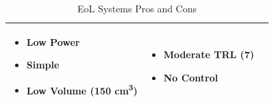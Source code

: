 \begin{table}[H]
\begin{tabular}{|p{}|p{}|p{}|}
    \begin{itemize}
        \item Low Power
        \item Simple
        \item Low Volume (150 cm\textsuperscript{3})\cite{RODEO_Presentation}
    \end{itemize}
    &
    \begin{itemize}
        \item Moderate TRL (7)
        \item No Control
    \end{itemize}
    \\
\hline
\end{tabular}
\caption{EoL Systems Pros and Cons}
\label{tbl:Eol_ProCon}
\end{table}
